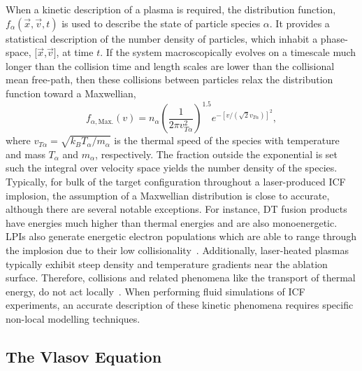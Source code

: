 When a kinetic description of a plasma is required, the distribution function, $f_{\alpha}(\vec{x},\vec{v},t)$ is used to describe the state of particle species $\alpha$.
It provides a statistical description of the number density of particles, which inhabit a phase-space, $[\vec{x}$,$\vec{v}]$, at time $t$.
If the system macroscopically evolves on a timescale much longer than the collision time and length scales are lower than the collisional mean free-path, then these collisions between particles relax the distribution function toward a Maxwellian,
\begin{equation}
    \label{eq:theory_maxwellian}
    f_{\alpha,\text{Max.}}(v) = n_{\alpha} {\left( \frac{1}{2\pi v_{T\alpha}^2} \right)}^{1.5} e^{-\left [ v/ \left (\sqrt{2} v_{T\alpha} \right ) \right ]^2},
\end{equation}
where $v_{T\alpha}=\sqrt{k_B T_{\alpha}/m_{\alpha}}$ is the thermal speed of the species with temperature and mass $T_{\alpha}$ and $m_{\alpha}$, respectively.
The fraction outside the exponential is set such the integral over velocity space yields the number density of the species.
Typically, for bulk of the target configuration throughout a laser-produced \ac{ICF} implosion, the assumption of a Maxwellian distribution is close to accurate, although there are several notable exceptions.
For instance, DT fusion products have energies much higher than thermal energies and are also monoenergetic.
\ac{LPIs} also generate energetic electron populations which are able to range through the implosion due to their low collisionality~\cite{barlow_role_2022}.
Additionally, laser-heated plasmas typically exhibit steep density and temperature gradients near the ablation surface.
Therefore, collisions and related phenomena like the transport of thermal energy, do not act locally~\cite{epperlein_practical_1991}.
When performing fluid simulations of \ac{ICF} experiments, an accurate description of these kinetic phenomena requires specific non-local modelling techniques.

\subsection{The Vlasov Equation}%
\label{sec:theory_vlasov}

